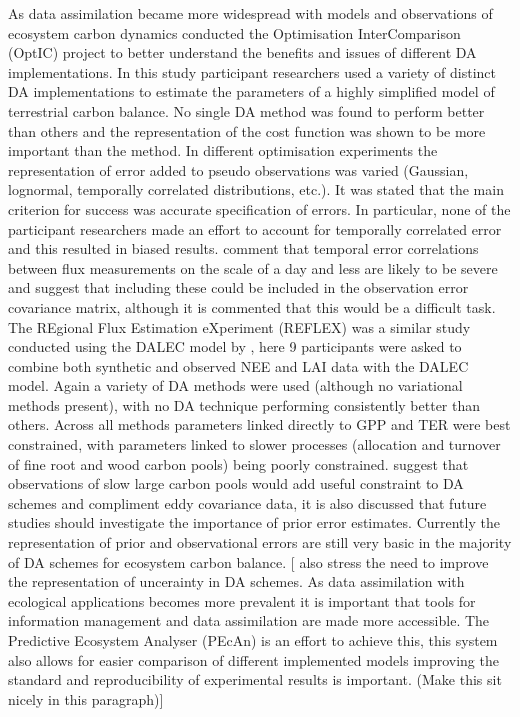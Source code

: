 \documentclass[12pt]{article}
\begin{document}
As data assimilation became more widespread with models and observations of ecosystem carbon dynamics \citet{trudinger2007optic} conducted the Optimisation InterComparison (OptIC) project to better understand the benefits and issues of different DA implementations. In this study participant researchers used a variety of distinct DA implementations to estimate the parameters of a highly simplified model of terrestrial carbon balance. No single DA method was found to perform better than others and the representation of the cost function was shown to be more important than the method. In different optimisation experiments the representation of error added to pseudo observations was varied (Gaussian, lognormal, temporally correlated distributions, etc.). It was stated that the main criterion for success was accurate specification of errors. In particular, none of the participant researchers made an effort to account for temporally correlated error and this resulted in biased results. \citet{williams2009improving} comment that temporal error correlations between flux measurements on the scale of a day and less are likely to be severe and suggest that including these could be included in the observation error covariance matrix, although it is commented that this would be a difficult task. The REgional Flux Estimation eXperiment (REFLEX) was a similar study conducted using the DALEC model by \citet{fox2009reflex}, here 9 participants were asked to combine both synthetic and observed NEE and LAI data with the DALEC model. Again a variety of DA methods were used (although no variational methods present), with no DA technique performing consistently better than others. Across all methods parameters linked directly to GPP and TER were best constrained, with parameters linked to slower processes (allocation and turnover of fine root and wood carbon pools) being poorly constrained. \citet{fox2009reflex} suggest that observations of slow large carbon pools would add useful constraint to DA schemes and compliment eddy covariance data, it is also discussed that future studies should investigate the importance of prior error estimates. Currently the representation of prior and observational errors are still very basic in the majority of DA schemes for ecosystem carbon balance. [\citep{Dietze2013} also stress the need to improve the representation of uncerainty in DA schemes. As data assimilation with ecological applications becomes more prevalent it is important that tools for information management and data assimilation are made more accessible. The Predictive Ecosystem Analyser (PEcAn) is an effort to achieve this, this system also allows for easier comparison of different implemented models \citep{Dietze2013} improving the standard and reproducibility of experimental results is important. (Make this sit nicely in this paragraph)]
\end{document}
